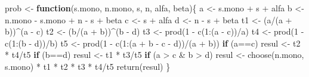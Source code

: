\documentclass[
  12pt,
  spanish,
]{book}
\newenvironment{Shaded}{\begin{snugshade}}{\end{snugshade}}
\newcommand{\ControlFlowTok}[1]{\textcolor[rgb]{0.13,0.29,0.53}{\textbf{#1}}}
\newcommand{\DecValTok}[1]{\textcolor[rgb]{0.00,0.00,0.81}{#1}}
\newcommand{\FunctionTok}[1]{\textcolor[rgb]{0.00,0.00,0.00}{#1}}
\newcommand{\NormalTok}[1]{#1}
\newcommand{\OtherTok}[1]{\textcolor[rgb]{0.56,0.35,0.01}{#1}}
\newcommand{\SpecialCharTok}[1]{\textcolor[rgb]{0.00,0.00,0.00}{#1}}
\theoremstyle{definition}
\theoremstyle{definition}
\theoremstyle{definition}
\theoremstyle{definition}
\theoremstyle{remark}
\begin{document}
\begin{Shaded}
\begin{Highlighting}[]
\NormalTok{prob }\OtherTok{\textless{}{-}} \ControlFlowTok{function}\NormalTok{(s.mono, n.mono, s, n, alfa, beta)\{}
\NormalTok{  a }\OtherTok{\textless{}{-}}\NormalTok{ s.mono }\SpecialCharTok{+}\NormalTok{ s }\SpecialCharTok{+}\NormalTok{ alfa}
\NormalTok{  b }\OtherTok{\textless{}{-}}\NormalTok{ n.mono }\SpecialCharTok{{-}}\NormalTok{ s.mono }\SpecialCharTok{+}\NormalTok{ n }\SpecialCharTok{{-}}\NormalTok{ s }\SpecialCharTok{+}\NormalTok{ beta }
\NormalTok{  c }\OtherTok{\textless{}{-}}\NormalTok{ s }\SpecialCharTok{+}\NormalTok{ alfa}
\NormalTok{  d }\OtherTok{\textless{}{-}}\NormalTok{ n }\SpecialCharTok{{-}}\NormalTok{ s }\SpecialCharTok{+}\NormalTok{ beta}
\NormalTok{  t1 }\OtherTok{\textless{}{-}}\NormalTok{ (a}\SpecialCharTok{/}\NormalTok{(a }\SpecialCharTok{+}\NormalTok{ b))}\SpecialCharTok{\^{}}\NormalTok{(a }\SpecialCharTok{{-}}\NormalTok{ c)}
\NormalTok{  t2 }\OtherTok{\textless{}{-}}\NormalTok{ (b}\SpecialCharTok{/}\NormalTok{(a }\SpecialCharTok{+}\NormalTok{ b))}\SpecialCharTok{\^{}}\NormalTok{(b }\SpecialCharTok{{-}}\NormalTok{ d) }
\NormalTok{  t3 }\OtherTok{\textless{}{-}} \FunctionTok{prod}\NormalTok{(}\DecValTok{1} \SpecialCharTok{{-}} \FunctionTok{c}\NormalTok{(}\DecValTok{1}\SpecialCharTok{:}\NormalTok{(a }\SpecialCharTok{{-}}\NormalTok{ c))}\SpecialCharTok{/}\NormalTok{a)}
\NormalTok{  t4 }\OtherTok{\textless{}{-}} \FunctionTok{prod}\NormalTok{(}\DecValTok{1} \SpecialCharTok{{-}} \FunctionTok{c}\NormalTok{(}\DecValTok{1}\SpecialCharTok{:}\NormalTok{(b }\SpecialCharTok{{-}}\NormalTok{ d))}\SpecialCharTok{/}\NormalTok{b) }
\NormalTok{  t5 }\OtherTok{\textless{}{-}} \FunctionTok{prod}\NormalTok{(}\DecValTok{1} \SpecialCharTok{{-}} \FunctionTok{c}\NormalTok{(}\DecValTok{1}\SpecialCharTok{:}\NormalTok{(a }\SpecialCharTok{+}\NormalTok{ b }\SpecialCharTok{{-}}\NormalTok{ c }\SpecialCharTok{{-}}\NormalTok{ d))}\SpecialCharTok{/}\NormalTok{(a }\SpecialCharTok{+}\NormalTok{ b))}
  \ControlFlowTok{if}\NormalTok{ (a}\SpecialCharTok{==}\NormalTok{c) }
\NormalTok{    resul }\OtherTok{\textless{}{-}}\NormalTok{ t2 }\SpecialCharTok{*}\NormalTok{ t4}\SpecialCharTok{/}\NormalTok{t5 }
  \ControlFlowTok{if}\NormalTok{ (b}\SpecialCharTok{==}\NormalTok{d)}
\NormalTok{    resul }\OtherTok{\textless{}{-}}\NormalTok{ t1 }\SpecialCharTok{*}\NormalTok{ t3}\SpecialCharTok{/}\NormalTok{t5}
  \ControlFlowTok{if}\NormalTok{ (a }\SpecialCharTok{\textgreater{}}\NormalTok{ c }\SpecialCharTok{\&}\NormalTok{ b }\SpecialCharTok{\textgreater{}}\NormalTok{ d)}
\NormalTok{    resul }\OtherTok{\textless{}{-}} \FunctionTok{choose}\NormalTok{(n.mono, s.mono) }\SpecialCharTok{*}\NormalTok{ t1 }\SpecialCharTok{*}\NormalTok{ t2 }\SpecialCharTok{*}\NormalTok{ t3 }\SpecialCharTok{*}\NormalTok{ t4}\SpecialCharTok{/}\NormalTok{t5}
  \FunctionTok{return}\NormalTok{(resul) }
\NormalTok{  \}}
\end{Highlighting}
\end{Shaded}
\end{document}
